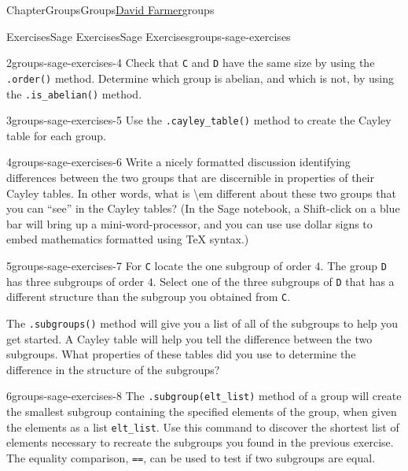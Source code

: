 \documentclass[oneside,10pt,]{book}
\newcommand{\mono}[1]{\texttt{#1}}
\numberwithin{equation}{section}
\begin{document}
\begin{chapterptx}{Chapter}{Groups}{}{Groups}{\hyperlink{dfarmer}{David Farmer}}{}{groups}
\begin{exercises-section}{Exercises}{Sage Exercises}{}{Sage Exercises}{}{}{groups-sage-exercises}
\begin{divisionexercise}{2}{}{}{groups-sage-exercises-4}
Check that \mono{C} and \mono{D} have the same size by using the \mono{.order()} method.  Determine which group is abelian, and which is not, by using the \mono{.is\_abelian()} method.%
\end{divisionexercise}%
\begin{divisionexercise}{3}{}{}{groups-sage-exercises-5}%
Use the \mono{.cayley\_table()} method to create the Cayley table for each group.%
\end{divisionexercise}%
\begin{divisionexercise}{4}{}{}{groups-sage-exercises-6}%
Write a nicely formatted discussion identifying differences between the two groups that are discernible in properties of their Cayley tables.  In other words, what is \textbraceleft{}\textbackslash{}em different\textbraceright{} about these two groups that you can ``see'' in the Cayley tables?  (In the Sage notebook, a Shift-click on a blue bar will bring up a mini-word-processor, and you can use use dollar signs to embed mathematics formatted using \TeX{} syntax.)%
\end{divisionexercise}%
\begin{divisionexercise}{5}{}{}{groups-sage-exercises-7}%
For \mono{C} locate the one subgroup of order \(4\).  The group \mono{D} has three subgroups of order \(4\).  Select one of the three subgroups of \mono{D} that has a different structure than the subgroup you obtained from \mono{C}.%
\par
The \mono{.subgroups()} method will give you a list of all of the subgroups to help you get started.  A Cayley table will help you tell the difference between the two subgroups.  What properties of these tables did you use to determine the difference in the structure of the subgroups?%
\end{divisionexercise}%
\begin{divisionexercise}{6}{}{}{groups-sage-exercises-8}%
The \mono{.subgroup(elt\_list)} method of a group will create the smallest subgroup containing the specified elements of the group, when given the elements as a list \mono{elt\_list}.  Use this command to discover the shortest list of elements necessary to recreate the subgroups you found in the previous exercise.  The equality comparison, \mono{==}, can be used to test if two subgroups are equal.%
\end{divisionexercise}%
\end{exercises-section}
%
%
\typeout{************************************************}

\end{chapterptx}
\end{document}
